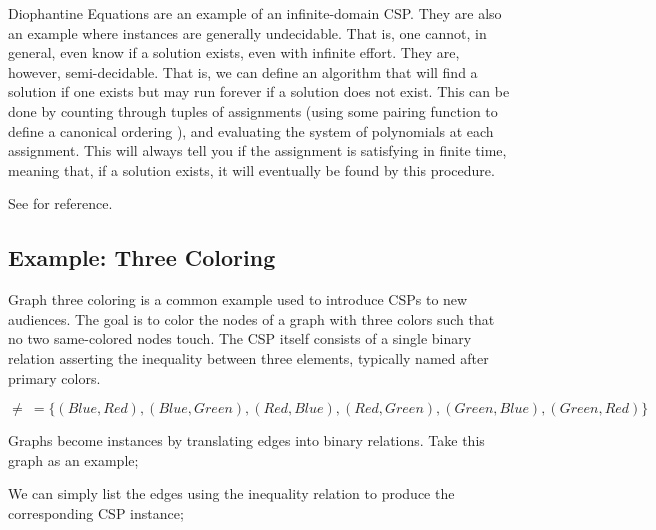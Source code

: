 Diophantine Equations are an example of an infinite-domain CSP. They are also an example where instances are generally undecidable. That is, one cannot, in general, even know if a solution exists, even with infinite effort. They are, however, semi-decidable. That is, we can define an algorithm that will find a solution if one exists but may run forever if a solution does not exist. This can be done by counting through tuples of assignments (using some pairing function to define a canonical ordering \citep{rosenberg2003efficient}), and evaluating the system of polynomials at each assignment. This will always tell you if the assignment is satisfying in finite time, meaning that, if a solution exists, it will eventually be found by this procedure.

See \citep{matiyasevich1993hilbert} for reference.

\subsection{Example: Three Coloring}\label{sec:three-coloring}

Graph three coloring is a common example used to introduce CSPs to new audiences. The goal is to color the nodes of a graph with three colors such that no two same-colored nodes touch. The CSP itself consists of a single binary relation asserting the inequality between three elements, typically named after primary colors.

\begin{equation}\label{equation:three-color-neq-def}
    \neq\ = \{ (Blue, Red), (Blue, Green), (Red, Blue), (Red, Green), (Green, Blue), (Green, Red) \}
\end{equation}

Graphs become instances by translating edges into binary relations. Take this graph as an example;

\begin{center}
\end{center}

We can simply list the edges using the inequality relation to produce the corresponding CSP instance;

